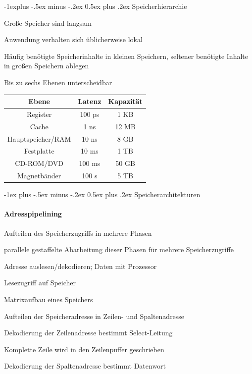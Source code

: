 \documentclass[10pt,landscape]{article}
\makeatletter
\renewcommand{\section}{\@startsection{section}{1}{0mm}%
                                {-1ex plus -.5ex minus -.2ex}%
                                {0.5ex plus .2ex}%
                                {\normalfont\large\bfseries}}
\renewcommand{\subsection}{\@startsection{subsection}{2}{0mm}%
                                {-1explus -.5ex minus -.2ex}%
                                {0.5ex plus .2ex}%
                                {\normalfont\normalsize\bfseries}}
\makeatother
\begin{document}
\begin{multicols}{3}
  \subsection{Speicherhierarchie}
  \begin{itemize*}
    \item Große Speicher sind langsam
    \item Anwendung verhalten sich üblicherweise lokal
    \item Häufig benötigte Speicherinhalte in kleinen Speichern, seltener benötigte Inhalte in großen Speichern ablegen
    \item Bis zu sechs Ebenen unterscheidbar
  \end{itemize*}
  
  \begin{center}
    \begin{tabular}{c | c | c}
      Ebene             & Latenz & Kapazität \\\hline
      Register          & 100 ps & 1 KB      \\
      Cache             & 1 ns   & 12 MB     \\
      Hauptspeicher/RAM & 10 ns  & 8 GB      \\
      Festplatte        & 10 ms  & 1 TB      \\
      CD-ROM/DVD        & 100 ms & 50 GB     \\
      Magnetbänder      & 100 s  & 5 TB
    \end{tabular}
  \end{center}

  
  \section{Speicherarchitekturen}
  \paragraph{Adresspipelining}
  \begin{itemize*}
    \item Aufteilen des Speicherzugriffs in mehrere Phasen
    \item parallele gestaffelte Abarbeitung dieser Phasen für mehrere Speicherzugriffe
    \item Adresse auslesen/dekodieren; Daten mit Prozessor
  \end{itemize*}
  Lesezugriff auf Speicher
  \begin{itemize*}
    \item Matrixaufbau eines Speichers
    \item Aufteilen der Speicheradresse in Zeilen- und Spaltenadresse
    \item Dekodierung der Zeilenadresse bestimmt Select-Leitung
    \item Komplette Zeile wird in den Zeilenpuffer geschrieben
    \item Dekodierung der Spaltenadresse bestimmt Datenwort
  \end{itemize*}
  

\end{multicols}
\end{document}
